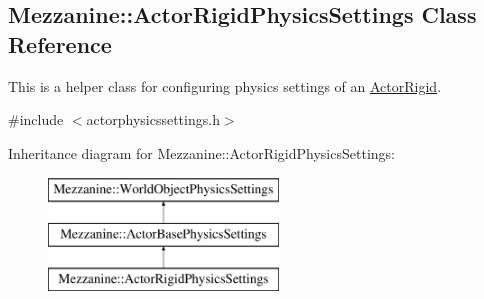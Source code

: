 \hypertarget{classMezzanine_1_1ActorRigidPhysicsSettings}{
\subsection{Mezzanine::ActorRigidPhysicsSettings Class Reference}
\label{classMezzanine_1_1ActorRigidPhysicsSettings}
}


This is a helper class for configuring physics settings of an \hyperlink{classMezzanine_1_1ActorRigid}{ActorRigid}.  




{\ttfamily \#include $<$actorphysicssettings.h$>$}

Inheritance diagram for Mezzanine::ActorRigidPhysicsSettings:\begin{figure}[H]
\begin{center}
\leavevmode
\includegraphics[height=3.000000cm]{classMezzanine_1_1ActorRigidPhysicsSettings}
\end{center}
\end{figure}
